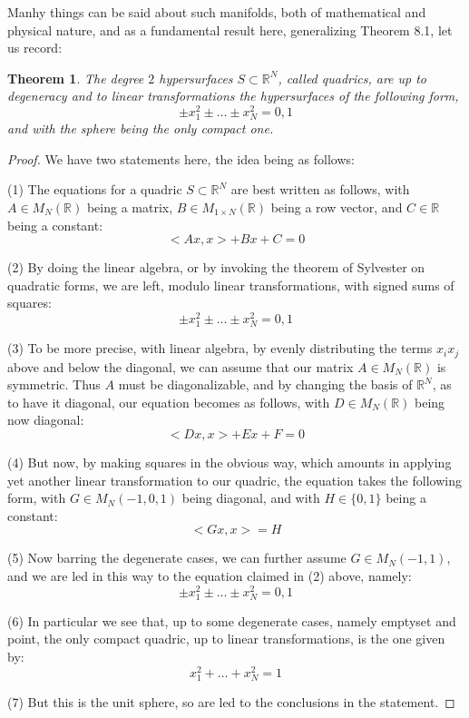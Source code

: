 \documentclass[12pt]{amsbook}
\newtheorem{theorem}{Theorem}[chapter]
\begin{document}
Manhy things can be said about such manifolds, both of mathematical and physical nature, and as a fundamental result here, generalizing Theorem 8.1, let us record:

\begin{theorem}
The degree $2$ hypersurfaces $S\subset\mathbb R^N$, called quadrics, are up to degeneracy and to linear transformations the hypersurfaces of the following form,
$$\pm x_1^2\pm\ldots\pm x_N^2=0,1$$
and with the sphere being the only compact one.
\end{theorem}

\begin{proof}
We have two statements here, the idea being as follows:

\medskip

(1) The equations for a quadric $S\subset\mathbb R^N$ are best written as follows, with $A\in M_N(\mathbb R)$ being a matrix, $B\in M_{1\times N}(\mathbb R)$ being a row vector, and $C\in\mathbb R$ being a constant:
$$<Ax,x>+Bx+C=0$$

(2) By doing the linear algebra, or by invoking the theorem of Sylvester on quadratic forms, we are left, modulo linear transformations, with signed sums of squares:
$$\pm x_1^2\pm\ldots\pm x_N^2=0,1$$

(3) To be more precise, with linear algebra, by evenly distributing the terms $x_ix_j$ above and below the diagonal, we can assume that our matrix $A\in M_N(\mathbb R)$ is symmetric. Thus $A$ must be diagonalizable, and by changing the basis of $\mathbb R^N$, as to have it diagonal, our equation becomes as follows, with $D\in M_N(\mathbb R)$ being now diagonal:
$$<Dx,x>+Ex+F=0$$

(4) But now, by making squares in the obvious way, which amounts in applying yet another linear transformation to our quadric, the equation takes the following form, with $G\in M_N(-1,0,1)$ being diagonal, and with $H\in\{0,1\}$ being a constant:
$$<Gx,x>=H$$

(5) Now barring the degenerate cases, we can further assume $G\in M_N(-1,1)$, and we are led in this way to the equation claimed in (2) above, namely:
$$\pm x_1^2\pm\ldots\pm x_N^2=0,1$$

(6) In particular we see that, up to some degenerate cases, namely emptyset and point, the only compact quadric, up to linear transformations, is the one given by:
$$x_1^2+\ldots+x_N^2=1$$

(7) But this is the unit sphere, so are led to the conclusions in the statement.
\end{proof}
\end{document}
